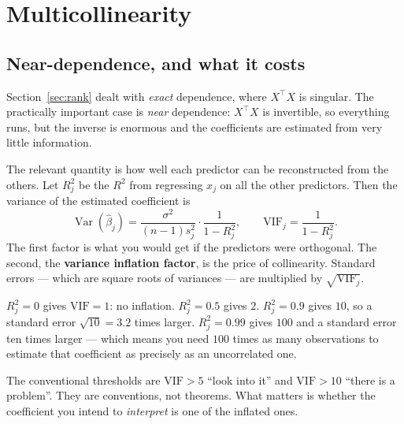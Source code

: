 \documentclass[11pt]{article}
\newcommand{\Xt}{X^{\!\top}}
\begin{document}
\notesources{\AMLUnitVSources}

\section{Multicollinearity}
\label{sec:mc}

\subsection{Near-dependence, and what it costs}

Section~\ref{sec:rank} dealt with \emph{exact} dependence, where $\Xt X$ is
singular. The practically important case is \emph{near} dependence: $\Xt X$ is
invertible, so everything runs, but the inverse is enormous and the
coefficients are estimated from very little information.

The relevant quantity is how well each predictor can be reconstructed from the
others. Let $R_j^2$ be the $R^2$ from regressing $x_j$ on all the other
predictors. Then the variance of the estimated coefficient is
\begin{equation}
  \label{eq:vif}
  \operatorname{Var}(\hat\beta_j) =
  \frac{\sigma^2}{(n-1)s_j^2}\cdot\frac{1}{1-R_j^2},
  \qquad
  \mathrm{VIF}_j = \frac{1}{1-R_j^2}.
\end{equation}
The first factor is what you would get if the predictors were orthogonal. The
second, the \textbf{variance inflation factor}, is the price of collinearity.
Standard errors --- which are square roots of variances --- are multiplied by
$\sqrt{\mathrm{VIF}_j}$.

\begin{worked}
$R_j^2 = 0$ gives $\mathrm{VIF} = 1$: no inflation. $R_j^2 = 0.5$ gives $2$.
$R_j^2 = 0.9$ gives $10$, so a standard error $\sqrt{10} = 3.2$ times larger.
$R_j^2 = 0.99$ gives $100$ and a standard error ten times larger --- which
means you need $100$ times as many observations to estimate that coefficient
as precisely as an uncorrelated one.

The conventional thresholds are $\mathrm{VIF} > 5$ ``look into it'' and
$\mathrm{VIF} > 10$ ``there is a problem''. They are conventions, not
theorems. What matters is whether the coefficient you intend to
\emph{interpret} is one of the inflated ones.
\end{worked}
\end{document}
